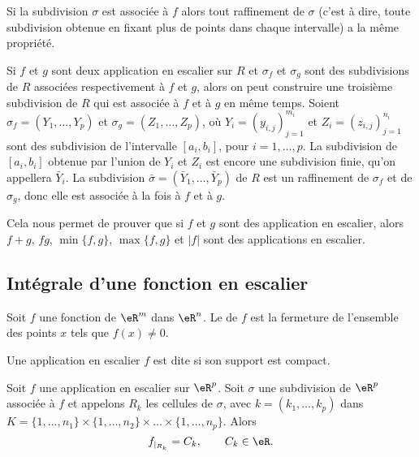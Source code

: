 \begin{remark}
 Si la subdivision $\sigma$ est associée à $f$ alors tout raffinement de $\sigma$ (c'est à dire, toute subdivision obtenue en fixant plus de points dans chaque intervalle) a la même propriété. 

Si $f$ et $g$ sont deux application en escalier sur $R$ et $\sigma_f$ et $\sigma_g$ sont des subdivisions de $R$ associées respectivement à $f$ et $g$, alors on peut construire une troisième subdivision de $R$ qui est associée à $f$ et à $g$ en même temps. Soient $\sigma_f=(Y_{1},\ldots, Y_{p})$ et $\sigma_g=(Z_{1},\ldots, Z_{p})$, où  $Y_{i}=(y_{i,j})_{j=1}^{m_i}$ et $Z_{i}=(z_{i,j})_{j=1}^{n_i}$ sont des subdivision de l'intervalle $[a_i, b_i]$, pour $i=1,\ldots, p$. La subdivision de $[a_i, b_i]$ obtenue par l'union de $Y_i$ et $Z_i$ est encore une subdivision finie, qu'on appellera $\bar Y_i$. La subdivision $\bar \sigma = (\bar Y_{1},\ldots,\bar Y_{p})$ de $R$ est un raffinement de $\sigma_f $ et de $\sigma_g$, donc elle est associée à la fois à $f$ et à $g$. 

Cela nous permet de prouver que si $f$ et $g$ sont des application en escalier, alors $f+g$, $fg$, $\min\{f,g\}$, $\max\{f,g\}$ et $|f|$ sont des applications en escalier. 
\end{remark}

\subsection{Intégrale d'une fonction en escalier}

\begin{definition}
  Soit $f$ une fonction de $\eR^m$ dans $\eR^n$. Le  de $f$ est la fermeture de l'ensemble des points $x$ tels que $f(x)\neq 0$. 
\end{definition}
\begin{definition}
Une application en escalier $f$ est dite  si son support est compact. 
\end{definition} 
Soit $f$ une application en escalier sur $\eR^p$. Soit $\sigma$ une subdivision de  $\eR^p$ associée à $f$ et appelons $R_k$ les cellules de $\sigma$, avec $k=(k_1,\ldots,k_p)$ dans $ K=\{1,\ldots,n_1\}\times\{1,\ldots,n_2\}\times\ldots \times\{1,\ldots,n_p\}$. Alors  
\[
f_{\vert_{R_k}}=C_k, \qquad C_k\in\eR.
\]

